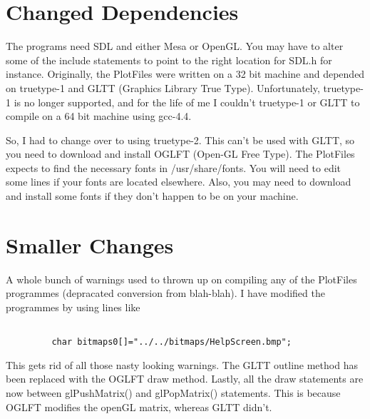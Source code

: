 \documentclass[12pt]{article}
\begin{document}
\section{Changed Dependencies}

The programs need SDL and either Mesa or OpenGL. You may have to alter some  of the include statements to point to the right location for SDL.h for instance. Originally, the PlotFiles were written on a 32 bit machine and depended on truetype-1
 and GLTT (Graphics Library True Type). Unfortunately, truetype-1 is no longer supported, and for the life of me I couldn't truetype-1 or GLTT to compile on a
64 bit machine  using gcc-4.4.

So, I had to change over to using truetype-2. This can't be used with GLTT, so you need to download and install OGLFT (Open-GL Free Type). The PlotFiles expects to find the necessary fonts in /usr/share/fonts. You will  need to edit some lines if your fonts are located elsewhere. Also, you may need to download and install some fonts if they don't happen to be on your machine.

\section{Smaller Changes}

A whole bunch of warnings used to thrown up on compiling any of the PlotFiles programmes (depracated conversion from blah-blah). I have modified the programmes by using lines like 
\begin{verbatim}

         char bitmaps0[]="../../bitmaps/HelpScreen.bmp";

\end{verbatim}
This gets rid of all those nasty looking warnings. The GLTT outline method has been replaced with the OGLFT draw method. Lastly, all the draw statements are now
between glPushMatrix() and glPopMatrix() statements. This is because OGLFT modifies the openGL matrix, whereas GLTT didn't.
\end{document}
